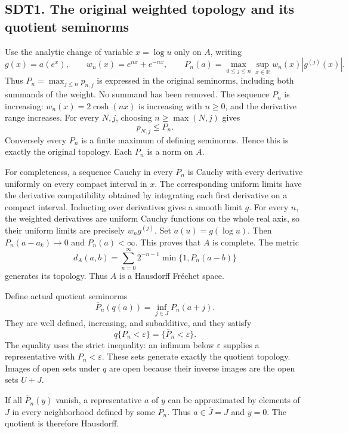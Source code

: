 \subsection{SDT1. The original weighted topology and its quotient
seminorms}\label{sdt1.-the-original-weighted-topology-and-its-quotient-seminorms}

Use the analytic change of variable \(x=\log u\) only on \(A\), writing
\[
g(x)=a(e^x),\qquad
w_n(x)=e^{nx}+e^{-nx},\qquad
P_n(a)=\max_{0\le j\le n}\sup_{x\in\mathbb R}
w_n(x)|g^{(j)}(x)|.
\tag{SDT1.1}
\] Thus \(P_n=\max_{j\le n}p_{n,j}\) is expressed in the original
seminorms, including both summands of the weight. No summand has been
removed. The sequence \(P_n\) is increasing: \(w_n(x)=2\cosh(nx)\) is
increasing with \(n\ge0\), and the derivative range increases. For every
\(N,j\), choosing \(n\ge\max(N,j)\) gives \[
p_{N,j}\le P_n.
\tag{SDT1.2}
\] Conversely every \(P_n\) is a finite maximum of defining seminorms.
Hence this is exactly the original topology. Each \(P_n\) is a norm on
\(A\).

For completeness, a sequence Cauchy in every \(P_n\) is Cauchy with
every derivative uniformly on every compact interval in \(x\). The
corresponding uniform limits have the derivative compatibility obtained
by integrating each first derivative on a compact interval. Inducting
over derivatives gives a smooth limit \(g\). For every \(n\), the
weighted derivatives are uniform Cauchy functions on the whole real
axis, so their uniform limits are precisely \(w_n g^{(j)}\). Set
\(a(u)=g(\log u)\). Then \(P_n(a-a_k)\to0\) and \(P_n(a)<\infty\). This
proves that \(A\) is complete. The metric \[
d_A(a,b)=\sum_{n=0}^\infty 2^{-n-1}
\min\{1,P_n(a-b)\}
\tag{SDT1.3}
\] generates its topology. Thus \(A\) is a Hausdorff Fréchet space.

Define actual quotient seminorms \[
\overline P_n(q(a))=\inf_{j\in J}P_n(a+j).
\tag{SDT1.4}
\] They are well defined, increasing, and subadditive, and they satisfy
\[
q\{P_n<\varepsilon\}=\{\overline P_n<\varepsilon\}.
\tag{SDT1.5}
\] The equality uses the strict inequality: an infimum below
\(\varepsilon\) supplies a representative with \(P_n<\varepsilon\).
These sets generate exactly the quotient topology. Images of open sets
under \(q\) are open because their inverse images are the open sets
\(U+J\).

If all \(\overline P_n(y)\) vanish, a representative \(a\) of \(y\) can
be approximated by elements of \(J\) in every neighborhood defined by
some \(P_n\). Thus \(a\in\overline J=J\) and \(y=0\). The quotient is
therefore Hausdorff.

